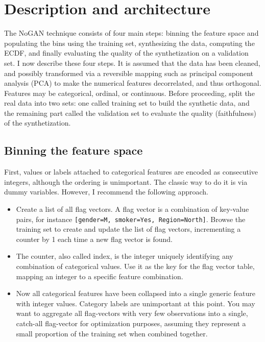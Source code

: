\documentclass[oneside,10pt]{book}
\begin{document}
\section{Description and architecture}\label{daberikh}

The NoGAN technique consists of four main steps: binning the feature space and populating the bins using the training set, synthesizing the data, computing the ECDF,
 and finally evaluating the quality of the synthetization on a validation set.  I now describe these four steps. It is assumed that the data has been cleaned, and possibly transformed via a reversible mapping such as \textcolor{index}{principal component analysis} (PCA) to make the numerical features decorrelated, and thus orthogonal. Features may be categorical, ordinal, or continuous. Before proceeding, split the real data into two sets: one called \textcolor{index}{training set} to build the synthetic data, and the remaining part called the \textcolor{index}{validation set} to evaluate the quality (faithfulness) of the synthetization.

\subsection{Binning the feature space}

First, values or labels attached to categorical features are encoded as consecutive integers, although the ordering is unimportant. The classic way to do it is
 via \textcolor{index}{dummy variables}. However, I recommend the following approach. %

\begin{itemize}
\item Create a list of all flag vectors. A flag vector is a combination of \textcolor{index}{key-value pairs},
 for instance \texttt{[gender=M, smoker=Yes, Region=North]}. Browse the training set to create and update the list of flag vectors, incrementing a counter by 1 each time a new flag vector is found.
\item The counter, also called index, is the integer uniquely identifying any combination of categorical values. Use it as the key for the flag vector table, mapping an integer to a specific feature combination.
\item Now all categorical features have been collapsed into a single generic feature with integer values. Category labels are unimportant at this point. You may want to aggregate all flag-vectors with very few observations into a single, catch-all flag-vector for optimization purposes, assuming they represent a small proportion of the training set
 when combined together.
\end{itemize}\vspace{1ex}
\end{document}
